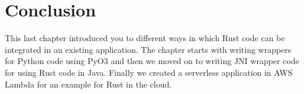 \documentclass{book}
\begin{document}
\label{sec:rust_in_the_cloud}

\section{Conclusion}%

This last chapter introduced you to different ways in which Rust code can be integrated in an existing application. The chapter starts with writing wrappers for Python code using PyO3 and then we moved on to writing JNI wrapper code for using Rust code in Java. Finally we created a serverless application in AWS Lambda for an example for Rust in the cloud.

\label{sec:conclusion}

\printbibliography
\nocite{*}
\end{document}
